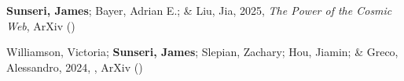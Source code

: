 \item \textbf{Sunseri, James}; Bayer, Adrian E.; \& Liu, Jia, 2025, \emph{The Power of the Cosmic Web}, ArXiv ()

\item Williamson, Victoria; \textbf{Sunseri, James}; Slepian, Zachary; Hou, Jiamin; \& Greco, Alessandro, 2024, , ArXiv ()